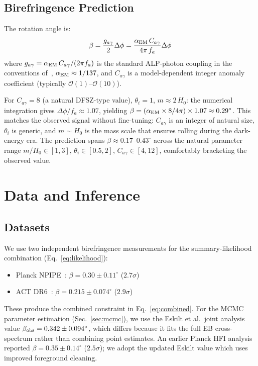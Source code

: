 \documentclass[a4paper,11pt]{article}
\begin{document}
\subsection{Birefringence Prediction}\label{sec:beta_prediction}

The rotation angle is:
\begin{equation}\label{eq:rotation}
\beta = \frac{g_{a\gamma}}{2} \Delta\phi = \frac{\alpha_{\rm EM}\, C_{a\gamma}}{4\pi\, f_a} \Delta\phi
\end{equation}
where $g_{a\gamma} = \alpha_{\rm EM}\, C_{a\gamma} / (2\pi f_a)$ is the standard ALP-photon coupling in the conventions of~\citet{Fujita2021}, $\alpha_{\rm EM} \approx 1/137$, and $C_{a\gamma}$ is a model-dependent integer anomaly coefficient (typically $\mathcal{O}(1)$--$\mathcal{O}(10)$).

For $C_{a\gamma} = 8$ (a natural DFSZ-type value), $\theta_i = 1$, $m \approx 2\,H_0$: the numerical integration gives $\Delta\phi/f_a \approx 1.07$, yielding $\beta = (\alpha_{\rm EM} \times 8 / 4\pi) \times 1.07 \approx 0.29^\circ$. This matches the observed signal without fine-tuning: $C_{a\gamma}$ is an integer of natural size, $\theta_i$ is generic, and $m \sim H_0$ is the mass scale that ensures rolling during the dark-energy era. The prediction spans $\beta \approx 0.17$--$0.43^\circ$ across the natural parameter range $m/H_0 \in [1, 3]$, $\theta_i \in [0.5, 2]$, $C_{a\gamma} \in [4, 12]$, comfortably bracketing the observed value.

\section{Data and Inference}

\subsection{Datasets}\label{sec:datasets}

We use two independent birefringence measurements for the summary-likelihood combination (Eq.~\ref{eq:likelihood}):
\begin{itemize}
\item Planck NPIPE~\citep{Eskilt2022}: $\beta = 0.30 \pm 0.11^\circ$ ($2.7\sigma$)
\item ACT DR6~\citep{DiegoPalazuelos2025}: $\beta = 0.215 \pm 0.074^\circ$ ($2.9\sigma$)
\end{itemize}
These produce the combined constraint in Eq.~\ref{eq:combined}. For the MCMC parameter estimation (Sec.~\ref{sec:mcmc}), we use the Eskilt et al.\ joint analysis value $\beta_{\rm obs} = 0.342 \pm 0.094^\circ$, which differs because it fits the full EB cross-spectrum rather than combining point estimates. An earlier Planck HFI analysis~\citep{Minami2020} reported $\beta = 0.35 \pm 0.14^\circ$ ($2.5\sigma$); we adopt the updated Eskilt value which uses improved foreground cleaning.
\end{document}
